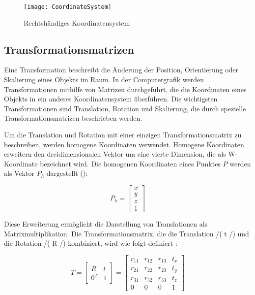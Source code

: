 \begin{figure}
    \centering
    \texttt{[image: CoordinateSystem]}
    \caption{Rechtshändiges Koordinatensystem \cite{appledevdoc}\label{fig:Koordinatensystem}}\par
\end{figure}

\subsection{Transformationsmatrizen}

Eine Transformation beschreibt die Änderung der Position, Orientierung oder Skalierung eines Objekts im Raum. In der Computergrafik werden Transformationen mithilfe von Matrizen durchgeführt, die die Koordinaten eines Objekts in ein anderes Koordinatensystem überführen. Die wichtigsten Transformationen sind Translation, Rotation und Skalierung, die durch spezielle Transformationsmatrizen beschrieben werden. \cite{doerner2022virtual, gao2021vSLAM, pezzi2021matrices}

Um die Translation und Rotation mit einer einzigen Transformationsmatrix zu beschreiben, werden homogene Koordinaten verwendet. Homogene Koordinaten erweitern den dreidimensionalen Vektor um eine vierte Dimension, die als W-Koordinate bezeichnet wird. Die homogenen Koordinaten eines Punktes \(P\) werden als Vektor \(P_h\) dargestellt (\cite{doerner2022virtual, gao2021vSLAM, freescale2010math3d}):

\begin{equation}
P_h = \begin{bmatrix} x \\ y \\ z \\ 1 \end{bmatrix}
\end{equation}

Diese Erweiterung ermöglicht die Darstellung von Translationen als Matrixmultiplikation. Die Transformationsmatrix, die die Translation /( t /) und die Rotation /( R /) kombiniert, wird wie folgt definiert \cite{doerner2022virtual, gao2021vSLAM, freescale2010math3d}:

\begin{equation}
T = \begin{bmatrix} R & t \\ 0^T & 1 \end{bmatrix} = 
\begin{bmatrix} 
    r_{11} & r_{12} & r_{13} & t_x \\ 
    r_{21} & r_{22} & r_{23} & t_y \\ 
    r_{31} & r_{32} & r_{33} & t_z \\ 
    0 & 0 & 0 & 1 
\end{bmatrix}
\end{equation}

